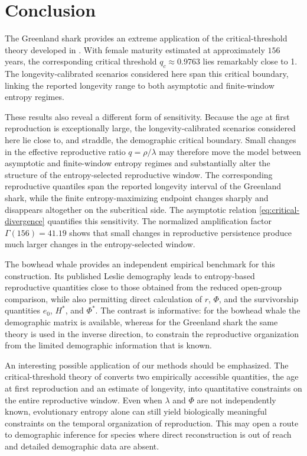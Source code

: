 \documentclass[11pt,a4paper]{amsart}
\begin{document}
\section{Conclusion}


The Greenland shark provides an extreme application of the critical-threshold
theory developed in \cite{BuescuElaydiOliveira2026}. With female maturity
estimated at approximately \(156\) years, the corresponding critical
threshold \(q_c\approx0.9763\) lies remarkably close to 1. The
longevity-calibrated scenarios considered here span this critical boundary,
linking the reported longevity range to both asymptotic and finite-window
entropy regimes.

These results also reveal a different form of sensitivity. Because the age
at first reproduction is exceptionally large, the longevity-calibrated
scenarios considered here lie close to, and straddle, the demographic
critical boundary. Small changes in the effective reproductive ratio
\(q=\rho/\lambda\) may therefore move the model between asymptotic and
finite-window entropy regimes and substantially alter the structure of the
entropy-selected reproductive window. The corresponding reproductive
quantiles span the reported longevity interval of the Greenland shark,
while the finite entropy-maximizing endpoint changes sharply and disappears
altogether on the subcritical side.
The asymptotic relation \eqref{eq:critical-divergence} quantifies this
sensitivity. The normalized amplification factor 
\(\Gamma(156)=41.19\) shows that small changes in reproductive persistence
produce much larger changes in the entropy-selected window.

The bowhead whale provides an independent empirical benchmark for this
construction. Its published Leslie demography leads to entropy-based
reproductive quantities close to those obtained from the reduced
open-group comparison, while also permitting direct calculation of
$r$, $\Phi$, and the survivorship quantities $e_0$, $H^\ast$, and
$\Phi^\ast$. The contrast is informative: for the bowhead whale the
demographic matrix is available, whereas for the Greenland shark the
same theory is used in the inverse direction, to constrain the
reproductive organization from the limited demographic information
that is known.


An interesting possible application of our methods should be emphasized. The critical-threshold theory of \cite{BuescuElaydiOliveira2026} converts two empirically accessible quantities, the age at first reproduction and an estimate of longevity, into quantitative constraints on the entire reproductive window. Even when \(\lambda\) and \(\Phi\) are not independently known, evolutionary entropy alone can still yield biologically meaningful constraints on the temporal organization of reproduction. This may open a route to demographic inference for species where direct reconstruction is out of reach and detailed demographic data are absent. 
\end{document}
